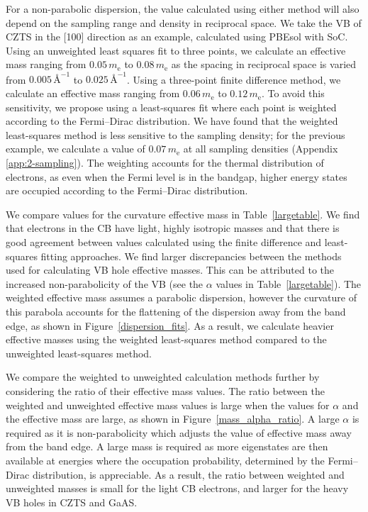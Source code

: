 For a non-parabolic dispersion, the value calculated using either method will also depend on the sampling range and density in reciprocal space. 
We take the VB of CZTS in the [100] direction as an example, calculated using PBEsol with SoC.
Using an unweighted least squares fit to three points, we calculate an effective mass ranging from $0.05\,m_\text{e}$ to $0.08\,m_\text{e}$ as the spacing in reciprocal space is varied from $0.005\,\text{\AA}^{-1}$ to $0.025\,\text{\AA}^{-1}$.
Using a three-point finite difference method, we calculate an effective mass ranging from $0.06\,m_\text{e}$ to $0.12\,m_\text{e}$.
To avoid this sensitivity, we propose using a least-squares fit where each point is weighted according to the Fermi--Dirac distribution.
We have found that the weighted least-squares method is less sensitive to the sampling density; 
for the previous example, we calculate a value of $0.07\,m_\text{e}$ at all sampling densities (Appendix \ref{app:2-sampling}). 
The weighting accounts for the thermal distribution of electrons, as even when the Fermi level is in the bandgap, higher energy states are occupied according to the Fermi--Dirac distribution. 

We compare values for the curvature effective mass in Table\ \ref{largetable}. 
We find that electrons in the CB have light, highly isotropic masses and that there is good agreement between values calculated using the finite difference and least-squares fitting approaches. 
We find larger discrepancies between the methods used for calculating VB hole effective masses. 
This can be attributed to the increased non-parabolicity of the VB (see the $\alpha$ values in Table\ \ref{largetable}). 
The weighted effective mass assumes a parabolic dispersion, however the curvature of this parabola accounts for the flattening of the dispersion away from the band edge, as shown in Figure\ \ref{dispersion_fits}. 
As a result, we calculate heavier effective masses using the weighted least-squares method compared to the unweighted least-squares method. 

We compare the weighted to unweighted calculation methods further by considering the ratio of their effective mass values.
The ratio between the weighted and unweighted effective mass values is large when the values for $\alpha$ and the effective mass are large, as shown in Figure\ \ref{mass_alpha_ratio}. 
A large $\alpha$ is required as it is non-parabolicity which adjusts the value of effective mass away from the band edge.
A large mass is required as more eigenstates are then available at energies where the occupation probability, determined by the Fermi--Dirac distribution, is appreciable. 
As a result, the ratio between weighted and unweighted masses is small for the light CB electrons, and larger for the heavy VB holes in CZTS and GaAS. 

